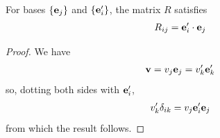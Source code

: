 \documentclass{../../template/note}
\begin{document}
    \begin{definition}
        \label{transformation-matrix}
        For bases \(\{\V e_j\}\) and \(\{\V e_i'\}\), the matrix \(R\) satisfies
        \begin{align*}
            R_{ij} = \V e_i' \cdot \V e_j
        \end{align*}
    \end{definition}

    \begin{proof}
        We have
        \begin{align*}
            \V v = v_j \V e _j = v_k' \V e_k'
        \end{align*}
        so, dotting both sides with \(\V e_i'\),
        \begin{align*}
            v'_k \delta_{ik} = v_j \V e_i' \V e_j
        \end{align*}
        from which the result follows.
    \end{proof}
    
\end{document}
